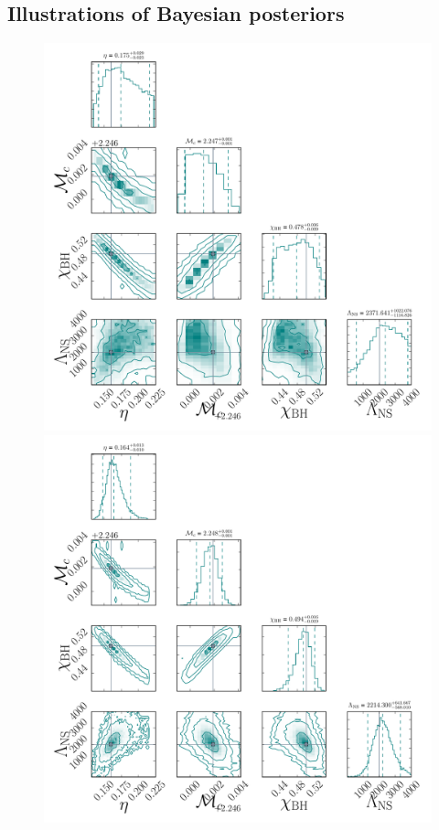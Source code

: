 \documentclass[aps,prd,amsmath,floats,floatfix, twocolumn,
superscriptaddress,nofootinbib,showpacs]{revtex4-1}
\begin{document}
\begin{appendix}
\section{Illustrations of Bayesian posteriors}\label{as1:illustrations}
% 
\begin{figure}
\centering
\includegraphics[width=1.05\columnwidth,trim=2cm 0 0 0]{AllParamsMcEtPDF1D2D_q4_mc2_25_chi0_50_snr20}%
\includegraphics[width=1.05\columnwidth,trim=0.7cm 0 1cm 0]{AllParamsMcEtPDF1D2D_q4_mc2_25_chi0_50_snr50}%

\end{figure}
\end{appendix}
\end{document}

